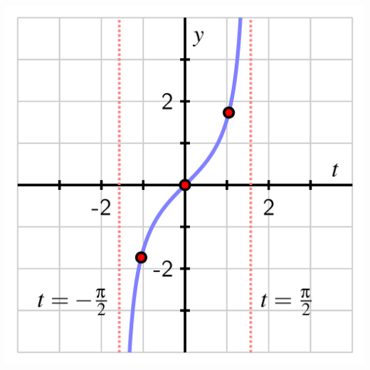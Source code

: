 \documentclass{ximera}
\begin{document}
\begin{problem}
\includegraphics[width=1\linewidth]{inverse-tan-graph.png}
\end{problem}
\end{document}
